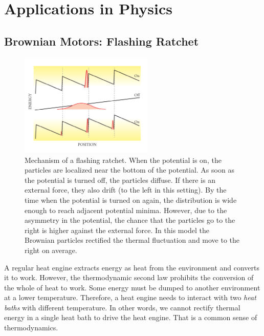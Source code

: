 \noindent
\section{Applications in Physics}

\subsection{Brownian Motors:  Flashing Ratchet}

\begin{figure}
\centering
\includegraphics[width=2.5in]{18.Langevin/ratchet.pdf}
\caption{Mechanism of a flashing ratchet. When the potential is on, the particles are localized near the bottom of the potential.  As soon as the potential is turned off, the particles diffuse.  If there is an external force, they also drift (to the left in this setting). By the time when the potential is turned on again, the distribution is wide enough to reach adjacent potential minima.  However, due to the asymmetry in the potential, the chance that the particles go to the right is higher against the external force.  In this model the Brownian particles rectified the thermal fluctuation and move to the right on average.}
\label{fig:flashing_ratchet}
\end{figure}

A regular heat engine extracts energy as heat from the environment and converts it to work.  However, the thermodynamic second law prohibits the conversion of the whole of heat to work.  Some energy must be dumped to another environment at a lower temperature.  Therefore, a heat engine needs to interact with two \textit{heat baths} with different temperature.  In other words, we cannot rectify thermal energy in a single heat bath to drive the heat engine.  That is a common sense of thermodynamics.

